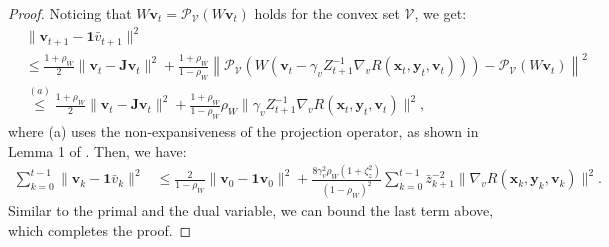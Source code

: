 \documentclass{article}
\theoremstyle{plain}
\theoremstyle{definition}
\theoremstyle{remark}
\begin{document}
\begin{proof}
Noticing that \(W \mathbf{v}_t = \mathcal{P}_{\mathcal{V}}(W \mathbf{v}_t)\) holds for the convex set \(\mathcal{V}\), we get:
\begin{align}
&\|\mathbf{v}_{t+1} - \mathbf{1} \bar{v}_{t+1} \|^2\nonumber\\ 
&\leq \frac{1 + \rho_W}{2}  \|\mathbf{v}_{t} - \mathbf{J} \mathbf{v}_{t}\|^2
+ \frac{1 + \rho_W}{1 - \rho_W} \left\|\mathcal{P}_{\mathcal{V}}  \left( W \left( \mathbf{v}_t - \gamma_v Z_{t+1}^{-1} \nabla_v R(\mathbf{x}_t, \mathbf{y}_t, \mathbf{v}_t)\right) \right) - \mathcal{P}_{\mathcal{V}}(W \mathbf{v}_t) \right\|^2\nonumber\\
&\overset{(a)}{\leq}\frac{1 + \rho_W}{2}  \|\mathbf{v}_{t} - \mathbf{J} \mathbf{v}_{t}\|^2
+ \frac{1 + \rho_W}{1 - \rho_W} \rho_W\| \gamma_v Z_{t+1}^{-1} \nabla_v R(\mathbf{x}_t, \mathbf{y}_t, \mathbf{v}_t) \|^2, \label{eq48}
\end{align}
where (a) uses the non-expansiveness of the projection operator, as shown in Lemma 1 of \citep{nedic2010constrained}. Then, we have:
\begin{align}
\sum_{k=0}^{t-1} \|\mathbf{v}_{k} - \mathbf{1} \bar{v}_{k} \|^2
&\leq \frac{2}{1 - \rho_W} \|\mathbf{v}_{0} - \mathbf{1} \mathbf{v}_{0} \|^2 
+ \frac{8 \gamma_v^2\rho_W (1 + \zeta_z^2)}{(1 - \rho_W)^2} \sum_{k=0}^{t-1} \bar{z}_{k+1}^{-2} \|\nabla_v R(\mathbf{x}_k, \mathbf{y}_k, \mathbf{v}_k)\|^2.\label{eq49}
\end{align}
Similar to the primal and the dual variable, we can bound the last term above, which completes the proof.
\end{proof}
\end{document}
